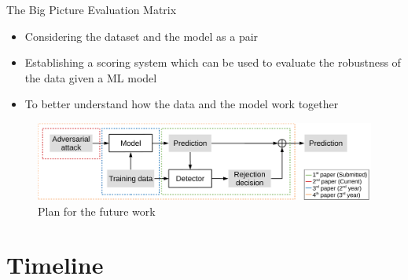 \documentclass[9pt]{beamer}
\begin{document}
\begin{frame}{The Big Picture}
Evaluation Matrix

\begin{itemize}
    \item Considering the dataset and the model as a pair
    \item Establishing a scoring system which can be used to evaluate the robustness of the data given a ML model
    \item To better understand how the data and the model work together
\end{itemize}

\begin{figure}[h!]
    \centering
    \scriptsize
    \includegraphics[width=\linewidth]{images/paper-timeline-diagram.pdf}
    \caption{Plan for the future work}
    \label{fig:timeline-boxes}
\end{figure}

\end{frame}

\section{Timeline}
\end{document}
